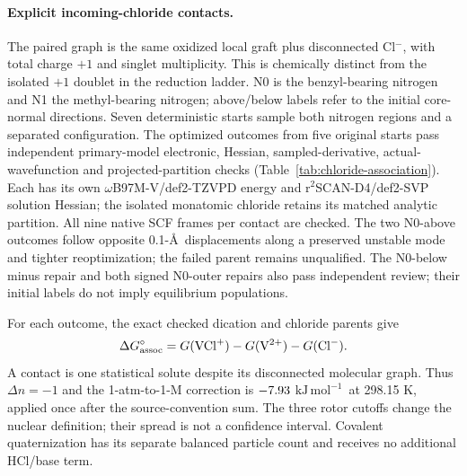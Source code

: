 \documentclass[11pt]{article}
\newcommand{\kj}{\ensuremath{\mathrm{kJ\,mol^{-1}}}}
\begin{document}
\paragraph{Explicit incoming-chloride contacts.}
The paired graph is the same oxidized local graft plus disconnected Cl$^-$, with total charge $+1$ and singlet multiplicity. This is chemically distinct from the isolated $+1$ doublet in the reduction ladder. N0 is the benzyl-bearing nitrogen and N1 the methyl-bearing nitrogen; above/below labels refer to the initial core-normal directions. Seven deterministic starts sample both nitrogen regions and a separated configuration. The \ChlorideOutcomeCount{} optimized outcomes from five original starts pass independent primary-model electronic, Hessian, sampled-derivative, actual-wavefunction and projected-partition checks (Table~\ref{tab:chloride-association}). Each has its own $\omega$B97M-V/def2-TZVPD energy and r$^2$SCAN-D4/def2-SVP solution Hessian; the isolated monatomic chloride retains its matched analytic partition. All nine native SCF frames per contact are checked. The two N0-above outcomes follow opposite 0.1-\AA\ displacements along a preserved unstable mode and tighter reoptimization; the failed parent remains unqualified. The N0-below minus repair and both signed N0-outer repairs also pass independent review; their initial labels do not imply equilibrium populations.

For each outcome, the exact checked dication and chloride parents give
\begin{equation}
\Delta G_{\rm assoc}^{\circ}=G(\mathrm{VCl}^{+})-G(\mathrm V^{2+})-G(\mathrm{Cl}^{-}).
\end{equation}
A contact is one statistical solute despite its disconnected molecular graph. Thus $\Delta n=-1$ and the 1-atm-to-1-M correction is $-7.93$ \kj\ at 298.15 K, applied once after the source-convention sum. The three rotor cutoffs change the nuclear definition; their spread is not a confidence interval. Covalent quaternization has its separate balanced particle count and receives no additional HCl/base term.

\begin{table}[htbp]\centering\small
\caption{Finite incoming-chloride association outcomes for the exact oxidized local graft in primary-model MeCN at 298.15 K. All $\Delta G$ values are kJ/mol at a 1-M solute standard state; subscripts denote qRRHO rotor cutoffs in cm$^{-1}$. Frequencies are cm$^{-1}$; FD error is the largest sampled-column relative error in percent. Outcome labels retain starting/repair history. The signed N0-above and N0-outer pairs each occupy one numerical duplicate group.}
\label{tab:chloride-association}

\end{table}
\end{document}
